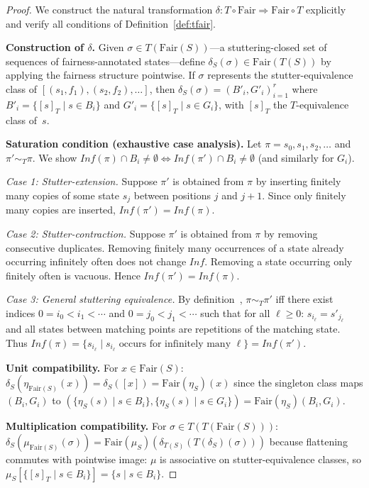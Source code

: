\documentclass[11pt]{article}
\newcommand{\Fair}{\ensuremath{\mathrm{Fair}}}
\begin{document}
\begin{proof}
We construct the natural transformation
$\delta : T \circ \Fair \Rightarrow \Fair \circ T$ explicitly and verify
all conditions of Definition~\ref{def:tfair}.

\textbf{Construction of $\delta$.}
Given $\sigma \in T(\Fair(S))$---a stuttering-closed set of sequences of
fairness-annotated states---define $\delta_S(\sigma) \in \Fair(T(S))$ by
applying the fairness structure pointwise.
If $\sigma$ represents the stutter-equivalence class of
$[(s_1, f_1), (s_2, f_2), \ldots]$, then
$\delta_S(\sigma) = (B'_i, G'_i)_{i=1}^r$ where
$B'_i = \{[s]_T \mid s \in B_i\}$ and
$G'_i = \{[s]_T \mid s \in G_i\}$,
with $[s]_T$ the $T$-equivalence class of~$s$.

\textbf{Saturation condition (exhaustive case analysis).}
Let $\pi = s_0, s_1, s_2, \ldots$ and $\pi' \sim_T \pi$.
We show $\mathit{Inf}(\pi) \cap B_i \neq \emptyset \Leftrightarrow
\mathit{Inf}(\pi') \cap B_i \neq \emptyset$ (and similarly for $G_i$).

\emph{Case 1: Stutter-extension.}
Suppose $\pi'$ is obtained from $\pi$ by inserting finitely many copies
of some state $s_j$ between positions $j$ and $j+1$.
Since only finitely many copies are inserted,
$\mathit{Inf}(\pi') = \mathit{Inf}(\pi)$.

\emph{Case 2: Stutter-contraction.}
Suppose $\pi'$ is obtained from $\pi$ by removing consecutive duplicates.
Removing finitely many occurrences of a state already occurring infinitely
often does not change $\mathit{Inf}$.
Removing a state occurring only finitely often is vacuous.
Hence $\mathit{Inf}(\pi') = \mathit{Inf}(\pi)$.

\emph{Case 3: General stuttering equivalence.}
By definition~\cite{BeoharK17,Lamport94}, $\pi \sim_T \pi'$ iff there
exist indices $0 = i_0 < i_1 < \cdots$ and $0 = j_0 < j_1 < \cdots$
such that for all $\ell \geq 0$: $s_{i_\ell} = s'_{j_\ell}$ and all
states between matching points are repetitions of the matching state.
Thus
$\mathit{Inf}(\pi) = \{s_{i_\ell} \mid s_{i_\ell} \text{ occurs for
infinitely many } \ell\} = \mathit{Inf}(\pi')$.

\textbf{Unit compatibility.}
For $x \in \Fair(S)$:
$\delta_S(\eta_{\Fair(S)}(x)) = \delta_S([x]) = \Fair(\eta_S)(x)$
since the singleton class maps $(B_i, G_i)$ to
$(\{\eta_S(s) \mid s \in B_i\}, \{\eta_S(s) \mid s \in G_i\})
= \Fair(\eta_S)(B_i, G_i)$.

\textbf{Multiplication compatibility.}
For $\sigma \in T(T(\Fair(S)))$:
$\delta_S(\mu_{\Fair(S)}(\sigma))
= \Fair(\mu_S)(\delta_{T(S)}(T(\delta_S)(\sigma)))$
because flattening commutes with pointwise image: $\mu$ is associative
on stutter-equivalence classes, so
$\mu_S[\{[s]_T \mid s \in B_i\}] = \{s \mid s \in B_i\}$.


\end{proof}
\end{document}
